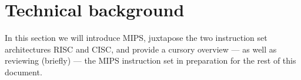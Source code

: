 \section{Technical background}

In this section we will introduce MIPS, juxtapose the two instruction
set architectures RISC and CISC, and provide a cursory overview --- as
well as reviewing (briefly) --- the MIPS instruction set in
preparation for the rest of this document.







